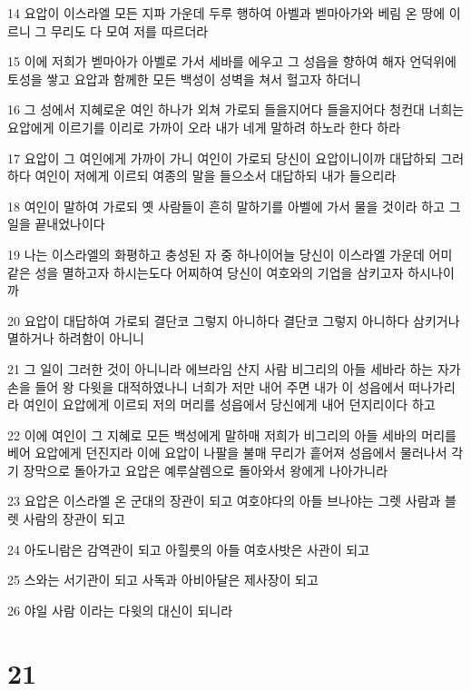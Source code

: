 \par 14 요압이 이스라엘 모든 지파 가운데 두루 행하여 아벨과 벧마아가와 베림 온 땅에 이르니 그 무리도 다 모여 저를 따르더라
\par 15 이에 저희가 벧마아가 아벨로 가서 세바를 에우고 그 성읍을 향하여 해자 언덕위에 토성을 쌓고 요압과 함께한 모든 백성이 성벽을 쳐서 헐고자 하더니
\par 16 그 성에서 지혜로운 여인 하나가 외쳐 가로되 들을지어다 들을지어다 청컨대 너희는 요압에게 이르기를 이리로 가까이 오라 내가 네게 말하려 하노라 한다 하라
\par 17 요압이 그 여인에게 가까이 가니 여인이 가로되 당신이 요압이니이까 대답하되 그러하다 여인이 저에게 이르되 여종의 말을 들으소서 대답하되 내가 들으리라
\par 18 여인이 말하여 가로되 옛 사람들이 흔히 말하기를 아벨에 가서 물을 것이라 하고 그 일을 끝내었나이다
\par 19 나는 이스라엘의 화평하고 충성된 자 중 하나이어늘 당신이 이스라엘 가운데 어미 같은 성을 멸하고자 하시는도다 어찌하여 당신이 여호와의 기업을 삼키고자 하시나이까
\par 20 요압이 대답하여 가로되 결단코 그렇지 아니하다 결단코 그렇지 아니하다 삼키거나 멸하거나 하려함이 아니니
\par 21 그 일이 그러한 것이 아니니라 에브라임 산지 사람 비그리의 아들 세바라 하는 자가 손을 들어 왕 다윗을 대적하였나니 너희가 저만 내어 주면 내가 이 성읍에서 떠나가리라 여인이 요압에게 이르되 저의 머리를 성읍에서 당신에게 내어 던지리이다 하고
\par 22 이에 여인이 그 지혜로 모든 백성에게 말하매 저희가 비그리의 아들 세바의 머리를 베어 요압에게 던진지라 이에 요압이 나팔을 불매 무리가 흩어져 성읍에서 물러나서 각기 장막으로 돌아가고 요압은 예루살렘으로 돌아와서 왕에게 나아가니라
\par 23 요압은 이스라엘 온 군대의 장관이 되고 여호야다의 아들 브나야는 그렛 사람과 블렛 사람의 장관이 되고
\par 24 아도니람은 감역관이 되고 아힐룻의 아들 여호사밧은 사관이 되고
\par 25 스와는 서기관이 되고 사독과 아비아달은 제사장이 되고
\par 26 야일 사람 이라는 다윗의 대신이 되니라

\chapter{21}

